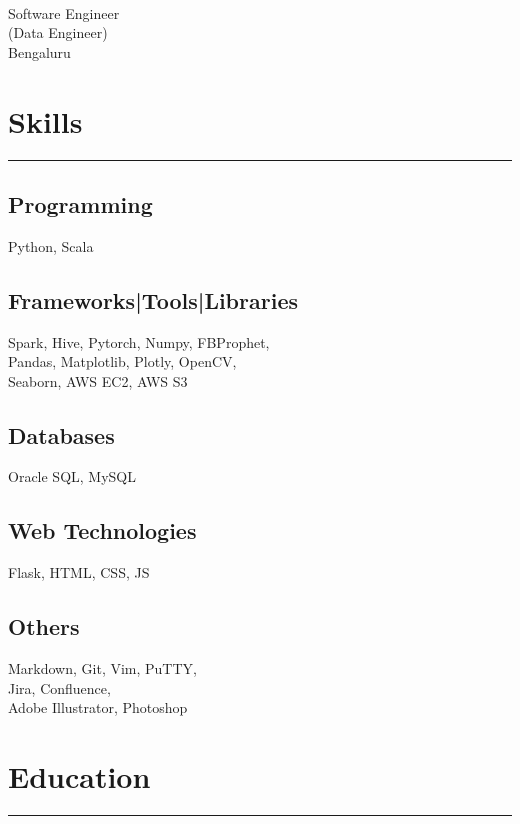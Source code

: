 \documentclass[]{puneet-resume}
\begin{document}
%
%

\begin{minipage}[t]{0.33\textwidth} 
\begin{large}
	\\
\end{large}
Software Engineer\\
(Data Engineer)\\
Bengaluru
\section{Skills}
\noindent\rule{5cm}{0.4pt}
\subsection{Programming}
Python, Scala
\vspace{6pt}
\subsection{Frameworks|Tools|Libraries}
Spark, Hive, Pytorch, Numpy, FBProphet,\\
Pandas, Matplotlib, Plotly, OpenCV,\\
Seaborn, AWS EC2, AWS S3
\vspace{6pt}
\subsection{Databases}
Oracle SQL, MySQL
\vspace{6pt}
\subsection{Web Technologies}
Flask, HTML, CSS, JS
\vspace{6pt}
\subsection{Others}
Markdown, Git, Vim, PuTTY,\\
Jira, Confluence,\\
Adobe Illustrator, Photoshop
\sectionsep
\section{Education} 
\noindent\rule{5cm}{0.4pt}\\

\end{minipage}
\end{document}
